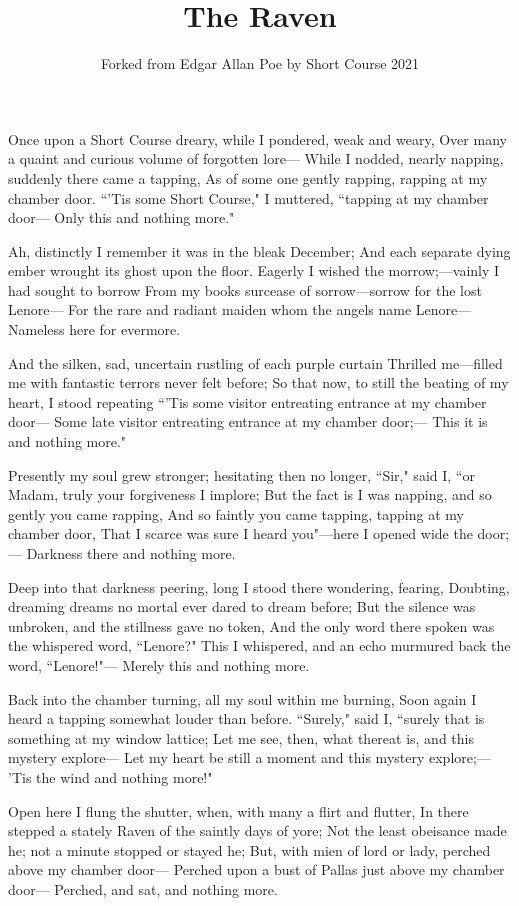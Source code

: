 \documentclass{article}
\title{The Raven}
\author{Forked from Edgar Allan Poe by Short Course 2021}
\begin{document}
\maketitle

Once upon a Short Course dreary, while I pondered, weak and weary,
Over many a quaint and curious volume of forgotten lore---
  While I nodded, nearly napping, suddenly there came a tapping,
As of some one gently rapping, rapping at my chamber door.
``’Tis some Short Course," I muttered, ``tapping at my chamber door---
Only this and nothing more."

Ah, distinctly I remember it was in the bleak December;
And each separate dying ember wrought its ghost upon the floor.
Eagerly I wished the morrow;---vainly I had sought to borrow
From my books surcease of sorrow---sorrow for the lost Lenore---
For the rare and radiant maiden whom the angels name Lenore---
Nameless here for evermore.

And the silken, sad, uncertain rustling of each purple curtain
Thrilled me---filled me with fantastic terrors never felt before;
So that now, to still the beating of my heart, I stood repeating
``’Tis some visitor entreating entrance at my chamber door---
Some late visitor entreating entrance at my chamber door;---
This it is and nothing more."

Presently my soul grew stronger; hesitating then no longer,
``Sir," said I, ``or Madam, truly your forgiveness I implore;
But the fact is I was napping, and so gently you came rapping,
And so faintly you came tapping, tapping at my chamber door,
That I scarce was sure I heard you"---here I opened wide the door;---
Darkness there and nothing more.

Deep into that darkness peering, long I stood there wondering, fearing,
Doubting, dreaming dreams no mortal ever dared to dream before;
But the silence was unbroken, and the stillness gave no token,
And the only word there spoken was the whispered word, ``Lenore?"
This I whispered, and an echo murmured back the word, ``Lenore!"---
Merely this and nothing more.

Back into the chamber turning, all my soul within me burning,
Soon again I heard a tapping somewhat louder than before.
``Surely," said I, ``surely that is something at my window lattice;
Let me see, then, what thereat is, and this mystery explore---
Let my heart be still a moment and this mystery explore;---
’Tis the wind and nothing more!"

Open here I flung the shutter, when, with many a flirt and flutter,
In there stepped a stately Raven of the saintly days of yore;
Not the least obeisance made he; not a minute stopped or stayed he;
But, with mien of lord or lady, perched above my chamber door---
Perched upon a bust of Pallas just above my chamber door---
Perched, and sat, and nothing more.
\end{document}
